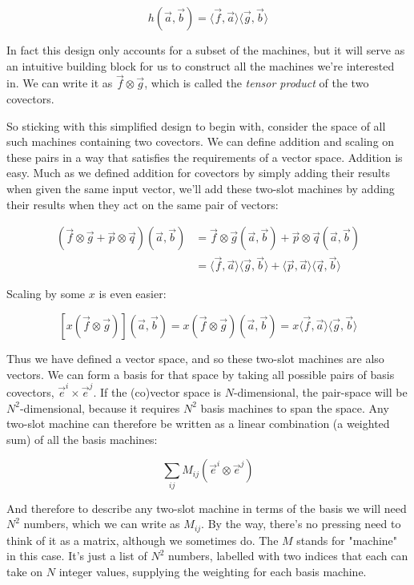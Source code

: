 $$
h(\vec{a}, \vec{b}) = \langle \vec{f},\vec{a} \rangle \langle \vec{g},\vec{b} \rangle
$$

In fact this design only accounts for a subset of the machines, but it will serve as an intuitive building block for us to construct all the machines we're interested in. We can write it as $\vec{f} \otimes \vec{g}$, which is called the \textit{tensor product} of the two covectors.

So sticking with this simplified design to begin with, consider the space of all such machines containing two covectors. We can define addition and scaling on these pairs in a way that satisfies the requirements of a vector space. Addition is easy. Much as we defined addition for covectors by simply adding their results when given the same input vector, we'll add these two-slot machines by adding their results when they act on the same pair of vectors:

\begin{equation}
\begin{split}
    (\vec{f} \otimes \vec{g} + \vec{p} \otimes \vec{q})(\vec{a}, \vec{b}) 
    &= 
    \vec{f} \otimes \vec{g} (\vec{a}, \vec{b}) + \vec{p} \otimes \vec{q}(\vec{a}, \vec{b}) \\
    &= \langle \vec{f}, \vec{a} \rangle
        \langle \vec{g}, \vec{b} \rangle
    + \langle \vec{p}, \vec{a} \rangle
        \langle \vec{q}, \vec{b} \rangle    
\end{split}        
\end{equation}

Scaling by some $x$ is even easier:

$$
\left[x(\vec{f} \otimes \vec{g})\right](\vec{a}, \vec{b}) 
= x(\vec{f} \otimes \vec{g})(\vec{a}, \vec{b}) 
= x \langle \vec{f}, \vec{a} \rangle
    \langle \vec{g}, \vec{b} \rangle
$$
 
Thus we have defined a vector space, and so these two-slot machines are also vectors. We can form a basis for that space by taking all possible pairs of basis covectors, $\vec{e}^i \times \vec{e}^j$. If the (co)vector space is $N$-dimensional, the pair-space will be $N^2$-dimensional, because it requires $N^2$ basis machines to span the space. Any two-slot machine can therefore be written as a linear combination (a weighted sum) of all the basis machines:

$$
\sum_{ij} M_{ij} (\vec{e}^i \otimes \vec{e}^j)
$$

And therefore to describe any two-slot machine in terms of the basis we will need $N^2$ numbers, which we can write as $M_{ij}$. By the way, there's no pressing need to think of it as a matrix, although we sometimes do. The $M$ stands for "machine" in this case. It's just a list of $N^2$ numbers, labelled with two indices that each can take on $N$ integer values, supplying the weighting for each basis machine.

